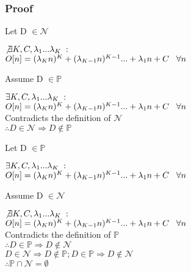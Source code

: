\documentclass[11pt]{article}
\begin{document}
\subsubsection{Proof}
Let D $\in \mathcal{N}$
\begin{center}
$\not \exists K,C,\lambda_1...\lambda_K \hspace{1mm} :$
\\ \vspace{2mm}
$O[n] = (\lambda_K n)^K + (\lambda_{K-1} n)^{K-1}... + \lambda_1 n + C \hspace{3mm} \forall n$
\end{center}
\vspace{4mm}
Assume D $\in \mathbb{P}$
\begin{center}
$\exists K,C,\lambda_1...\lambda_K \hspace{1mm} :$
\\ \vspace{2mm}
$O[n] = (\lambda_K n)^K + (\lambda_{K-1} n)^{K-1}... + \lambda_1 n + C \hspace{3mm} \forall n$
\\ \vspace{4mm}
Contradicts the definition of $\mathcal{N}$
\\ \vspace{2mm}
$
\therefore D \in \mathcal{N} \Rightarrow D \not \in \mathbb{P}
$
\end{center}
\vspace{6mm}
Let D $\in \mathbb{P}$
\begin{center}
$\exists K,C,\lambda_1...\lambda_K \hspace{1mm} :$
\\ \vspace{2mm}
$O[n] = (\lambda_K n)^K + (\lambda_{K-1} n)^{K-1}... + \lambda_1 n + C \hspace{3mm} \forall n$
\end{center}
\vspace{4mm}
Assume D $\in \mathcal{N}$
\begin{center}
$\not \exists K,C,\lambda_1...\lambda_K \hspace{1mm} :$
\\ \vspace{2mm}
$O[n] = (\lambda_K n)^K + (\lambda_{K-1} n)^{K-1}... + \lambda_1 n + C \hspace{3mm} \forall n$
\\ \vspace{4mm}
Contradicts the definition of $\mathbb{P}$
\\ \vspace{2mm}
$
\therefore D \in \mathbb{P} \Rightarrow D \not \in \mathcal{N}
$
\\ \vspace{6mm}
$
D \in \mathcal{N} \Rightarrow D \not \in \mathbb{P}; D \in \mathbb{P} \Rightarrow D \not \in \mathcal{N}
$
\\ \vspace{2mm}
$
\therefore \mathbb{P} \cap \mathcal{N} = \emptyset
$
\end{center}
\end{document}
